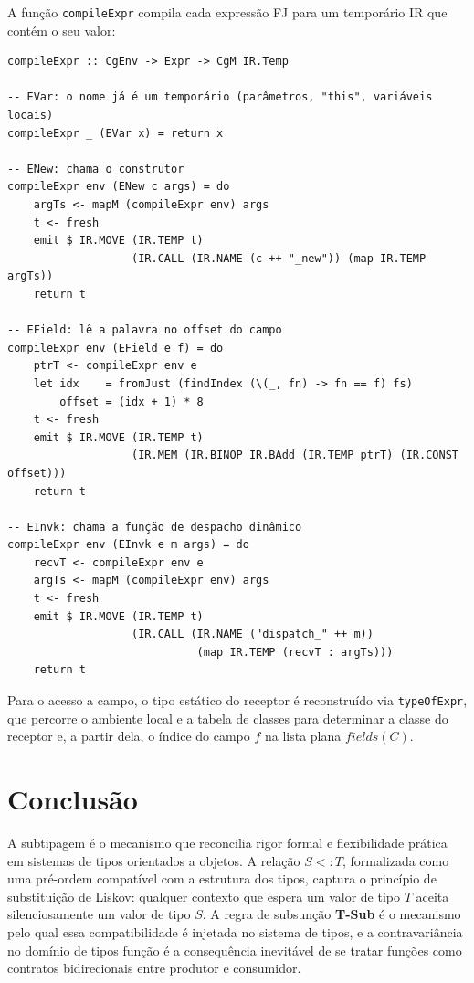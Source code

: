 A função \texttt{compileExpr} compila cada expressão FJ para um
temporário IR que contém o seu valor:

\begin{verbatim}
compileExpr :: CgEnv -> Expr -> CgM IR.Temp

-- EVar: o nome já é um temporário (parâmetros, "this", variáveis locais)
compileExpr _ (EVar x) = return x

-- ENew: chama o construtor
compileExpr env (ENew c args) = do
    argTs <- mapM (compileExpr env) args
    t <- fresh
    emit $ IR.MOVE (IR.TEMP t)
                   (IR.CALL (IR.NAME (c ++ "_new")) (map IR.TEMP argTs))
    return t

-- EField: lê a palavra no offset do campo
compileExpr env (EField e f) = do
    ptrT <- compileExpr env e
    let idx    = fromJust (findIndex (\(_, fn) -> fn == f) fs)
        offset = (idx + 1) * 8
    t <- fresh
    emit $ IR.MOVE (IR.TEMP t)
                   (IR.MEM (IR.BINOP IR.BAdd (IR.TEMP ptrT) (IR.CONST offset)))
    return t

-- EInvk: chama a função de despacho dinâmico
compileExpr env (EInvk e m args) = do
    recvT <- compileExpr env e
    argTs <- mapM (compileExpr env) args
    t <- fresh
    emit $ IR.MOVE (IR.TEMP t)
                   (IR.CALL (IR.NAME ("dispatch_" ++ m))
                             (map IR.TEMP (recvT : argTs)))
    return t
\end{verbatim}

Para o acesso a campo, o tipo estático do receptor é reconstruído via
\texttt{typeOfExpr}, que percorre o ambiente local e a tabela de
classes para determinar a classe do receptor e, a partir dela, o
índice do campo \(f\) na lista plana \(\mathit{fields}(C)\).

\section{Conclusão}

A subtipagem é o mecanismo que reconcilia rigor formal e flexibilidade
prática em sistemas de tipos orientados a objetos. A relação \(S <: T\),
formalizada como uma pré-ordem compatível com a estrutura dos tipos,
captura o princípio de substituição de Liskov: qualquer contexto que
espera um valor de tipo \(T\) aceita silenciosamente um valor de tipo
\(S\). A regra de subsunção \textbf{T-Sub} é o mecanismo pelo qual essa
compatibilidade é injetada no sistema de tipos, e a contravariância no
domínio de tipos função é a consequência inevitável de se tratar funções
como contratos bidirecionais entre produtor e consumidor.

